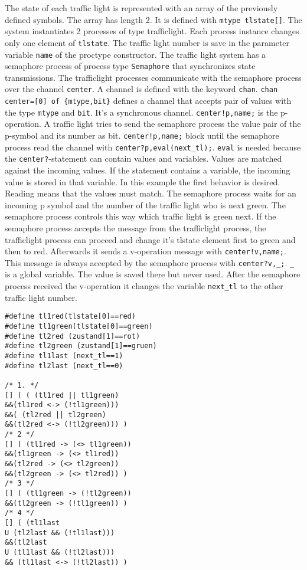 \documentclass[12pt,a4paper,twoside]{article}
\begin{document}
The state of each traffic light is represented with an array of the previously defined symbols. The array has length 2. It is defined with \texttt{mtype tlstate[]}. The system instantiates 2 processes of type trafficlight. Each process instance changes only one element of \texttt{tlstate}. The traffic light number is save in the parameter variable \texttt{name} of the proctype constructor. 
The traffic light system has a semaphore process of process type \texttt{Semaphore} that synchronizes state transmissions.  The trafficlight processes communicate with the semaphore process over the channel \texttt{center}. A channel is defined with the keyword \texttt{chan}. \texttt{chan center=[0] of \{mtype,bit\}} defines a channel that accepts pair of values with the type \texttt{mtype} and \texttt{bit}. It's a synchronous channel.  \texttt{center!p,name;} is the p-operation. A traffic light tries to send the semaphore process the value pair of the p-symbol and its number as bit. \texttt{center!p,name;} block until the semaphore process read the channel with \verb|center?p,eval(next_tl);|. \texttt{eval} is needed because the \texttt{center?}-statement can contain values and variables. Values are matched against the incoming values. If the statement contains a variable, the incoming value is stored in that variable. In this example the first behavior is desired. Reading means that the values must match. The semaphore process waits for an incoming p symbol and the number of the traffic light who is next green. The semaphore process controls this way which traffic light is green next. If the semaphore process accepts the message from the trafficlight process, the trafficlight process can proceed and change it's tlstate element first to green and then to red. Afterwards it sends a v-operation message with \texttt{center!v,name;}. This message is always accepted by the semaphore process with \verb|center?v,_;|. \verb|_| is a global variable. The value is saved there but never used. After the semaphore process received the v-operation it changes the variable \verb|next_tl| to the other traffic light number.


\begin{lstlisting}[label={lst:spinltl},caption={LTL-properties with formalized atomic propositions for spin}]
#define tl1red(tlstate[0]==red)
#define tl1green(tlstate[0]==green)
#define tl2red (zustand[1]==rot)
#define tl2green (zustand[1]==gruen)
#define tl1last (next_tl==1)
#define tl2last (next_tl==0)

/* 1. */
[] ( ( (tl1red || tl1green)
&&(tl1red <-> (!tl1green)))
&&( (tl2red || tl2green)
&&(tl2red <-> (!tl2green))) )
/* 2 */
[] ( (tl1red -> (<> tl1green))
&&(tl1green -> (<> tl1red))
&&(tl2red -> (<> tl2green))
&&(tl2green -> (<> tl2red)) )
/* 3 */
[] ( (tl1green -> (!tl2green))
&&(tl2green -> (!tl1green)) )
/* 4 */
[] ( (tl1last
U (tl2last && (!tl1last)))
&&(tl2last
U (tl1last && (!tl2last)))
&& (tl1last <-> (!tl2last)) )
\end{lstlisting}
\end{document}
